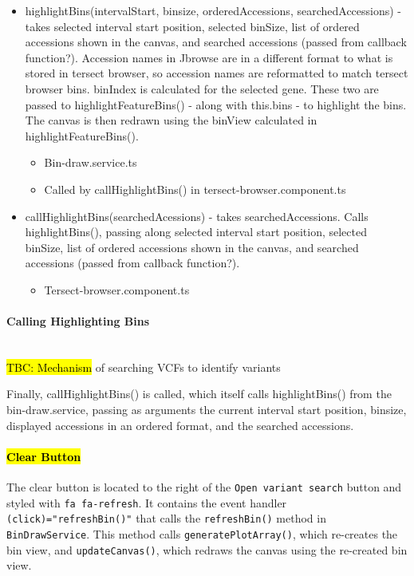 \documentclass[12pt]{article}
\begin{document}
\begin{itemize}
\begin{itemize}
\begin{itemize}
    \end{itemize}
    \item highlightBins(intervalStart, binsize, orderedAccessions, searchedAccessions) - takes selected interval start position, selected binSize, list of ordered accessions shown in the canvas, and searched accessions (passed from callback function?). Accession names in Jbrowse are in a different format to what is stored in tersect browser, so accession names are reformatted to match tersect browser bins. binIndex is calculated for the selected gene. These two are passed to highlightFeatureBins() - along with this.bins - to highlight the bins. The canvas is then redrawn using the binView calculated in highlightFeatureBins(). 
    \begin{itemize}
        \item Bin-draw.service.ts 
        \item Called by callHighlightBins() in tersect-browser.component.ts 
    \end{itemize}
    \item callHighlightBins(searchedAcessions) - takes searchedAccessions. Calls highlightBins(), passing along  selected interval start position, selected binSize, list of ordered accessions shown in the canvas, and searched accessions (passed from callback function?). 
    \begin{itemize}
        \item Tersect-browser.component.ts 
    \end{itemize}
\end{itemize}

\paragraph{Calling Highlighting Bins} \mbox{}
\\
\hl{TBC: Mechanism} of searching VCFs to identify variants 

Finally, callHighlightBins() is called, which itself calls highlightBins() from the bin-draw.service, passing as arguments the current interval start position, binsize, displayed accessions in an ordered format, and the searched accessions.  
\paragraph{\hl{Clear Button }}
The clear button is located to the right of the \verb+Open variant search+ button and styled with \verb+fa fa-refresh+. It contains the event handler \verb+(click)="refreshBin()"+ that calls the \verb+refreshBin()+ method in \verb+BinDrawService+.
This method calls \verb+generatePlotArray()+, which re-creates the bin view, and \verb+updateCanvas()+, which redraws the canvas using the re-created bin view.
 


\end{itemize}
\end{document}
